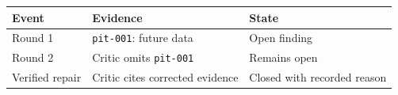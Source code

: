 \begin{tabular}{@{}P{3.0cm}P{4.6cm}P{4.9cm}@{}}
\toprule
\textbf{Event} & \textbf{Evidence} & \textbf{State} \\
\midrule
Round 1 & \texttt{pit-001}: future data & Open finding \\
Round 2 & Critic omits \texttt{pit-001} & Remains open \\
Verified repair & Critic cites corrected evidence & Closed with recorded reason \\
\bottomrule
\end{tabular}
